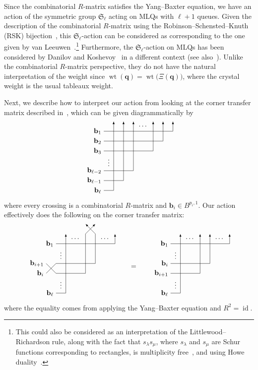 \documentclass[reqno]{amsart}
\newcommand{\0}{\phantom{c}}
\newcommand{\SymGp}[1]{\mathfrak{S}_{#1}} %
\DeclareMathOperator{\wt}{wt} %
\DeclareMathOperator{\id}{id} %
\newcommand{\qq}{\mathbf{q}}
\theoremstyle{plain}
\theoremstyle{definition}
\numberwithin{equation}{section}
\begin{document}
Since the combinatorial $R$-matrix satisfies the Yang--Baxter equation, we have an action of the symmetric group $\SymGp{\ell}$ acting on MLQs with $\ell + 1$ queues.
Given the description of the combinatorial $R$-matrix using the Robinson--Schensted--Knuth (RSK) bijection~\cite{Shimozono02}, this $\SymGp{\ell}$-action can be considered as corresponding to the one given by van Leeuwen~\cite[Lemma~2.3]{vanLeeuwen-dc}.\footnote{This could also be considered as an interpretation of the Littlewood--Richardson rule, along with the fact that $s_{\lambda} s_{\mu}$, where $s_{\lambda}$ and $s_{\mu}$ are Schur functions corresponding to rectangles, is multiplicity free~\cite{Stembridge01}, and using Howe duality~\cite[Ch.~9,App.~B]{BS17}.}
Furthermore, the $\SymGp{\ell}$-action on MLQs has been considered by Danilov and Koshevoy~\cite{DanilovKoshevoy} in a different context (see also~\cite[Ch.~4]{Gorodentsev2}).
Unlike the combinatorial $R$-matrix perspective, they do not have the natural interpretation of the weight since $\wt(\qq) = \wt\bigl( \Xi(\qq) \bigr)$, where the crystal weight is the usual tableaux weight.

Next, we describe how to interpret our action from looking at the corner transfer matrix described in~\cite{KMO15}, which can be given diagrammatically by
\[
\begin{tikzpicture}[>=latex,scale=0.5]
\draw[->] (0,1) node[anchor=east] {$\mathbf{b}_{\ell}$} -- (1,1) -- (1,8);
\foreach \x in {1,2} {
  \draw[->] (0,\x+1) node[anchor=east] {$\mathbf{b}_{\ell-\x}$} -- (\x+1,\x+1) -- (\x+1,8);
}
\foreach \x in {1,2,3} {
  \draw[->] (0,8-\x) node[anchor=east] {$\mathbf{b}_{\x}$} -- (8-\x,8-\x) -- (8-\x,8);
}
\node at (4,7.5) {$\cdots$};
\node at (0.5,4) {$\vdots$};
\end{tikzpicture}
\]
where every crossing is a combinatorial $R$-matrix and $\mathbf{b}_i \in B^{p_i,1}$.
Our action effectively does the following on the corner transfer matrix:
\[
\begin{tikzpicture}[>=latex,scale=0.5,baseline=50]
\draw[->] (0,1) node[anchor=east] {$\mathbf{b}_{\ell}$} -- (1,1) -- (1,7);
\draw[->] (0,6) node[anchor=east] {$\mathbf{b}_1$} -- (6,6) -- (6,7);
\draw[->] (-1,3) node[anchor=east] {$\mathbf{b}_i$} -- (0,4) -- (4,4) -- (4,7) -- (3,8);
\draw[->] (-1,4) node[anchor=east] {$\mathbf{b}_{i+1}$} -- (0,3) -- (3,3) -- (3,7) -- (4,8);
\node at (2,6.5) {$\cdots$};
\node at (0.5,2) {$\vdots$};
\node at (5,6.5) {$\cdots$};
\node at (0.5,5) {$\vdots$};
\end{tikzpicture}
\qquad = \qquad
\begin{tikzpicture}[>=latex,scale=0.5,baseline=50]
\draw[->] (0,1) node[anchor=east] {$\mathbf{b}_{\ell}$} -- (1,1) -- (1,7);
\draw[->] (0,6) node[anchor=east] {$\mathbf{b}_1$} -- (6,6) -- (6,7);
\draw[->] (0,4) node[anchor=east] {$\mathbf{b}_i$} -- (4,4) -- (4,7);
\draw[->] (0,3) node[anchor=east] {$\mathbf{b}_{i+1}$} -- (3,3) -- (3,7);
\node at (2,6.5) {$\cdots$};
\node at (0.5,2) {$\vdots$};
\node at (5,6.5) {$\cdots$};
\node at (0.5,5) {$\vdots$};
\end{tikzpicture}
\]
where the equality comes from applying the Yang--Baxter equation and $R^2 = \id$.
\end{document}
